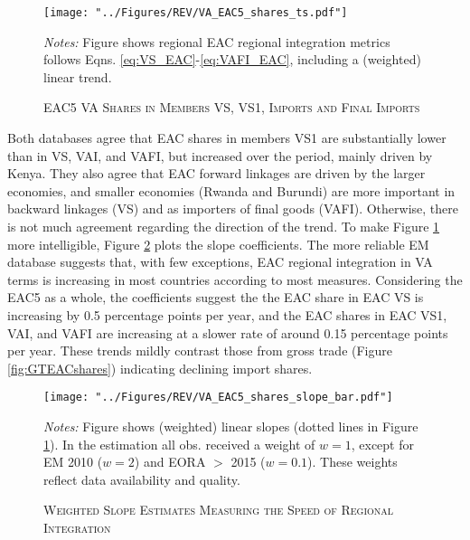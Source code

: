 \documentclass[a4paper]{article}
\begin{document}
%
%
\begin{figure}[h!] \vspace{-3mm}
\centering
\caption{\label{fig:VAEACshares}\textsc{EAC5 VA Shares in Members VS, VS1, Imports and Final Imports}}
\texttt{[image: "../Figures/REV/VA\_EAC5\_shares\_ts.pdf"]} \\ %
\raggedright
\scriptsize
\emph{Notes:} Figure shows regional EAC regional integration metrics follows Eqns. \ref{eq:VS_EAC}-\ref{eq:VAFI_EAC}, including a (weighted) linear trend. 
\end{figure}
\FloatBarrier
%
Both databases agree that EAC shares in members VS1 are substantially lower than in VS, VAI, and VAFI, but increased over the period, mainly driven by Kenya. They also agree that EAC forward linkages are driven by the larger economies, and smaller economies (Rwanda and Burundi) are more important in backward linkages (VS) and as importers of final goods (VAFI). Otherwise, there is not much agreement regarding the direction of the trend. To make Figure \ref{fig:VAEACshares} more intelligible, Figure \ref{fig:VAEACshares_bar} plots the slope coefficients. %
The more reliable EM database suggests that, with few exceptions, EAC regional integration in VA terms is increasing in most countries according to most measures. Considering the EAC5 as a whole, the coefficients suggest the the EAC share in EAC VS is increasing by 0.5 percentage points per year, and the EAC shares in EAC VS1, VAI, and VAFI are increasing at a slower rate of around 0.15 percentage points per year. These trends mildly contrast those from gross trade (Figure \ref{fig:GTEACshares}) indicating declining import shares. 
%
\begin{figure}[h!] \vspace{-5mm}
\centering
\caption{\label{fig:VAEACshares_bar}\textsc{Weighted Slope Estimates Measuring the Speed of Regional Integration}}
\texttt{[image: "../Figures/REV/VA\_EAC5\_shares\_slope\_bar.pdf"]} \\ %
\raggedright
\scriptsize
\emph{Notes:} Figure shows (weighted) linear slopes (dotted lines in Figure \ref{fig:VAEACshares}). In the estimation all obs. received a weight of $w=1$, except for EM 2010 ($w=2$) and EORA $>$ 2015 ($w=0.1$). These weights reflect data availability and quality.  
  \vspace{-1mm}
\end{figure}
\end{document}
